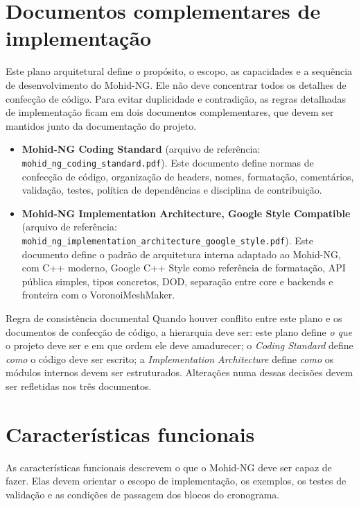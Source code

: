 \documentclass[11pt,a4paper]{article}
\begin{document}
\section{Documentos complementares de implementa\c{c}\~ao}

Este plano arquitetural define o prop\'osito, o escopo, as capacidades e a sequ\^encia de desenvolvimento do Mohid-NG. Ele n\~ao deve concentrar todos os detalhes de confec\c{c}\~ao de c\'odigo. Para evitar duplicidade e contradi\c{c}\~ao, as regras detalhadas de implementa\c{c}\~ao ficam em dois documentos complementares, que devem ser mantidos junto da documenta\c{c}\~ao do projeto.


\begin{itemize}
  \item \textbf{Mohid-NG Coding Standard} (arquivo de refer\^encia: \texttt{mohid\_ng\_coding\_standard.pdf}). Este documento define normas de confec\c{c}\~ao de c\'odigo, organiza\c{c}\~ao de headers, nomes, formata\c{c}\~ao, coment\'arios, valida\c{c}\~ao, testes, pol\'itica de depend\^encias e disciplina de contribui\c{c}\~ao.
  \item \textbf{Mohid-NG Implementation Architecture, Google Style Compatible} (arquivo de refer\^encia: \texttt{mohid\_ng\_implementation\_architecture\_google\_style.pdf}). Este documento define o padr\~ao de arquitetura interna adaptado ao Mohid-NG, com C++ moderno, Google C++ Style como refer\^encia de formata\c{c}\~ao, API p\'ublica simples, tipos concretos, DOD, separa\c{c}\~ao entre core e backends e fronteira com o VoronoiMeshMaker.
\end{itemize}


\begin{principlebox}{Regra de consist\^encia documental}
Quando houver conflito entre este plano e os documentos de confec\c{c}\~ao de c\'odigo, a hierarquia deve ser: este plano define \emph{o que} o projeto deve ser e em que ordem ele deve amadurecer; o \emph{Coding Standard} define \emph{como} o c\'odigo deve ser escrito; a \emph{Implementation Architecture} define \emph{como} os m\'odulos internos devem ser estruturados. Altera\c{c}\~oes numa dessas decis\~oes devem ser refletidas nos tr\^es documentos.
\end{principlebox}

\section{Caracter\'isticas funcionais}

As caracter\'isticas funcionais descrevem o que o Mohid-NG deve ser capaz de fazer. Elas devem orientar o escopo de implementa\c{c}\~ao, os exemplos, os testes de valida\c{c}\~ao e as condi\c{c}\~oes de passagem dos blocos do cronograma.
\end{document}
